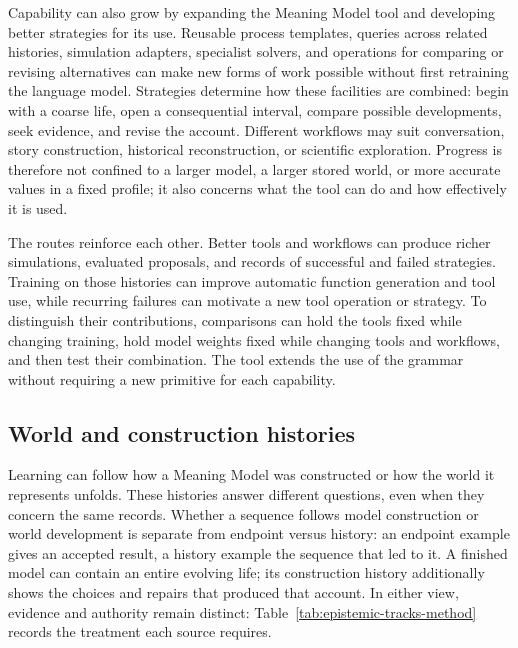 \documentclass[10pt]{article}
\begin{document}
Capability can also grow by expanding the Meaning Model tool and developing
better strategies for its use. Reusable process templates, queries across
related histories, simulation adapters, specialist solvers, and operations
for comparing or revising alternatives can make new forms of work possible
without first retraining the language model. Strategies determine how these
facilities are combined: begin with a coarse life, open a consequential
interval, compare possible developments, seek evidence, and revise the account.
Different workflows may suit conversation, story construction, historical
reconstruction, or scientific exploration. Progress is therefore not confined
to a larger model, a larger stored world, or more accurate values in a fixed
profile; it also concerns what the tool can do and how effectively it is used.

The routes reinforce each other. Better tools and workflows can produce
richer simulations, evaluated proposals, and records of successful and failed
strategies. Training on those histories can improve automatic function
generation and tool use, while recurring failures can motivate a new tool
operation or strategy. To distinguish their contributions, comparisons can
hold the tools fixed while changing training, hold model weights fixed while
changing tools and workflows, and then test their combination. The tool
extends the use of the grammar without requiring a new primitive for each
capability.

\subsection{World and construction histories}
\label{sec:construction-histories}

Learning can follow how a Meaning Model was constructed or how the world it
represents unfolds. These histories answer different questions, even when
they concern the same records. Whether a sequence follows model construction
or world development is separate from endpoint versus history: an endpoint example
gives an accepted result, a history example the sequence that led to it. A finished
model can contain an entire evolving life; its construction history
additionally shows the choices and repairs that produced that account.
In either view, evidence and authority remain
distinct: Table~\ref{tab:epistemic-tracks-method} records the treatment each
source requires.
\end{document}
